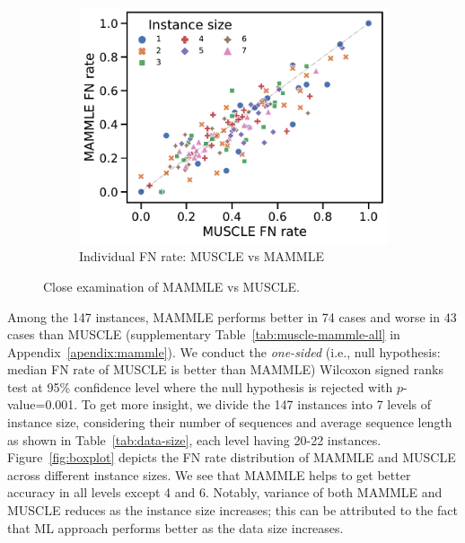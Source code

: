 \begin{figure}[!htbp]
\begin{adjustwidth}{-1.1cm}{}
		\begin{subfigure}{0.60\textwidth} \includegraphics[width=\textwidth]{Figure/delta5} \caption{Individual FN rate: MUSCLE vs MAMMLE}\label{fig:scatter_fn}\end{subfigure}
	\end{adjustwidth}
	\caption{Close examination of MAMMLE vs MUSCLE.}
	\label{fig:mammle-result}
\end{figure}

Among the 147 instances, MAMMLE performs better in 74 cases and worse in 43 cases than MUSCLE (supplementary Table~\ref{tab:muscle-mammle-all} in Appendix~\ref{apendix:mammle}). We conduct the \textit{one-sided} (i.e., null hypothesis: median FN rate of MUSCLE is better than MAMMLE) Wilcoxon signed ranks test at 95\% confidence level where the null hypothesis is rejected with $p$-value=0.001. To get more insight, we divide the 147 instances into 7 levels of instance size, considering their number of sequences and average sequence length as shown in Table~\ref{tab:data-size}, each level having 20-22 instances. Figure~\ref{fig:boxplot} depicts the FN rate distribution of MAMMLE and MUSCLE across different instance sizes. We see that MAMMLE helps to get better accuracy in all levels except 4 and 6. Notably, variance of both MAMMLE and MUSCLE reduces as the instance size increases; this can be attributed to the fact that ML approach performs better as the data size increases. 

